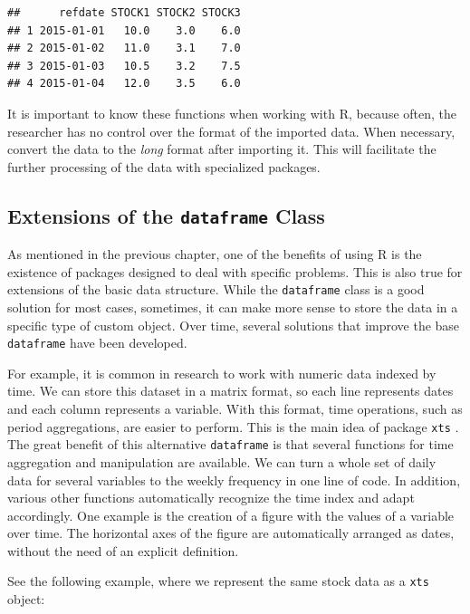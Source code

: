 \documentclass[11pt,]{book}
\begin{document}
\begin{verbatim}
##      refdate STOCK1 STOCK2 STOCK3
## 1 2015-01-01   10.0    3.0    6.0
## 2 2015-01-02   11.0    3.1    7.0
## 3 2015-01-03   10.5    3.2    7.5
## 4 2015-01-04   12.0    3.5    6.0
\end{verbatim}

It is important to know these functions when working with R, because
often, the researcher has no control over the format of the imported
data. When necessary, convert the data to the \emph{long} format after
importing it. This will facilitate the further processing of the data
with specialized packages.

\subsection{\texorpdfstring{Extensions of the \texttt{dataframe}
Class}{Extensions of the dataframe Class}}\label{extensions-of-the-dataframe-class}

As mentioned in the previous chapter, one of the benefits of using R is
the existence of packages designed to deal with specific problems. This
is also true for extensions of the basic data structure. While the
\texttt{dataframe} class is a good solution for most cases, sometimes,
it can make more sense to store the data in a specific type of custom
object. Over time, several solutions that improve the base
\texttt{dataframe} have been developed.

For example, it is common in research to work with numeric data indexed
by time. We can store this dataset in a matrix format, so each line
represents dates and each column represents a variable. With this
format, time operations, such as period aggregations, are easier to
perform. This is the main idea of package \texttt{xts} \citep{xts2014}.
The great benefit of this alternative \texttt{dataframe} is that several
functions for time aggregation and manipulation are available. We can
turn a whole set of daily data for several variables to the weekly
frequency in one line of code. In addition, various other functions
automatically recognize the time index and adapt accordingly. One
example is the creation of a figure with the values of a variable over
time. The horizontal axes of the figure are automatically arranged as
dates, without the need of an explicit definition. 

See the following example, where we represent the same stock data as a
\texttt{xts} object: 
\end{document}
